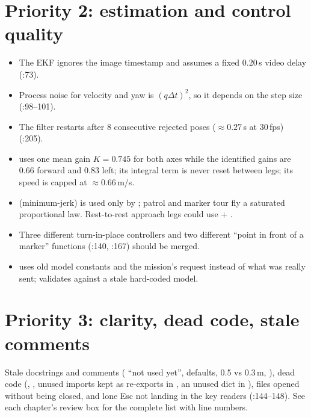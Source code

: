 \section{Priority 2: estimation and control quality}

\begin{itemize}[leftmargin=*]
\item The EKF ignores the image timestamp and assumes a fixed 0.20\,s video delay (:73).
\item Process noise for velocity and yaw is $(q\Delta t)^2$, so it depends on the step size (:98--101).
\item The filter restarts after 8 consecutive rejected poses ($\approx 0.27$\,s at 30\,fps) (:205).
\item {} uses one mean gain $K=0.745$ for both axes while the identified gains are 0.66 forward
  and 0.83 left; its integral term is never reset between legs; its speed is capped at $\approx 0.66$\,m/s.
\item {} (minimum-jerk) is used only by ; patrol and marker tour fly a saturated
  proportional law. Rest-to-rest approach legs could use  + .
\item Three different turn-in-place controllers and two different ``point in front of a marker'' functions
  (:140, :167) should be merged.
\item {} uses old model constants and the mission's request instead of what was really
  sent;  validates against a stale hard-coded model.
\end{itemize}

\section{Priority 3: clarity, dead code, stale comments}

Stale docstrings and comments ( ``not used yet'',  defaults,
 0.5 vs 0.3\,m, ), dead code (,
, unused imports kept as re-exports in , an unused  dict in
), files opened without being closed, and lone Esc not landing in the key readers
(:144--148). See each chapter's review box for the complete list with line numbers.


